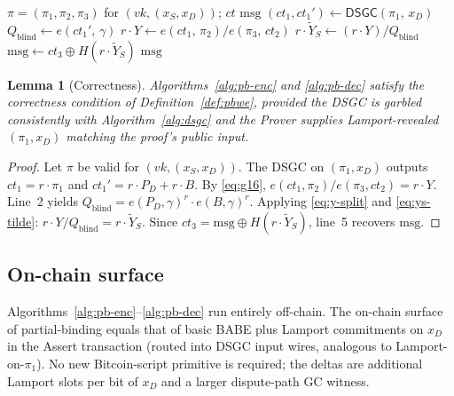 \documentclass[11pt]{article}
\newtheorem{lemma}{Lemma}
\newcommand{\msg}{\mathrm{msg}}
\newcommand{\Dec}{\mathsf{Dec}}
\begin{document}
\begin{algorithm}[H]
\caption{$\Dec^\star(\pi, x = (x_S, x_D), ct)$ \hfill{\footnotesize Prover, off-chain, $T_2$}}
\label{alg:pb-dec}
\begin{algorithmic}[1]
\Require $\pi = (\pi_1, \pi_2, \pi_3)$ for $(vk, (x_S, x_D))$; $ct$
\Ensure $\msg$
\State $(ct_1, ct_1') \gets \mathsf{DSGC}(\pi_1,\, x_D)$ 
\State $Q_{\mathrm{blind}} \gets e(ct_1',\, \gamma)$
\State $r \cdot Y \gets e(ct_1,\, \pi_2) / e(\pi_3,\, ct_2)$ 
\State $r \cdot \widetilde{Y}_S \gets (r \cdot Y) / Q_{\mathrm{blind}}$
\State $\msg \gets ct_3 \oplus H(r \cdot \widetilde{Y}_S)$
\State \Return $\msg$
\end{algorithmic}
\end{algorithm}

\begin{lemma}[Correctness]\label{lem:correct}
Algorithms~\ref{alg:pb-enc} and \ref{alg:pb-dec} satisfy the
correctness condition of Definition~\ref{def:pbwe}, provided the
DSGC is garbled consistently with Algorithm~\ref{alg:dsgc} and the
Prover supplies Lamport-revealed $(\pi_1, x_D)$ matching the proof's
public input.
\end{lemma}

\begin{proof}
Let $\pi$ be valid for $(vk, (x_S, x_D))$. The DSGC on
$(\pi_1, x_D)$ outputs $ct_1 = r \cdot \pi_1$ and
$ct_1' = r \cdot P_D + r \cdot B$. By \eqref{eq:g16},
$e(ct_1, \pi_2) / e(\pi_3, ct_2) = r \cdot Y$. Line~2 yields
$Q_{\mathrm{blind}} = e(P_D, \gamma)^r \cdot e(B, \gamma)^r$.
Applying \eqref{eq:y-split} and \eqref{eq:ys-tilde}:
$r \cdot Y / Q_{\mathrm{blind}} = r \cdot \widetilde{Y}_S$. Since
$ct_3 = \msg \oplus H(r \cdot \widetilde{Y}_S)$, line~5 recovers
$\msg$.
\end{proof}

\subsection{On-chain surface}

Algorithms~\ref{alg:pb-enc}--\ref{alg:pb-dec} run entirely off-chain.
The on-chain surface of partial-binding equals that of basic BABE
plus Lamport commitments on $x_D$ in the Assert transaction (routed
into DSGC input wires, analogous to Lamport-on-$\pi_1$). No new
Bitcoin-script primitive is required; the deltas are additional
Lamport slots per bit of $x_D$ and a larger dispute-path GC witness.
\end{document}
